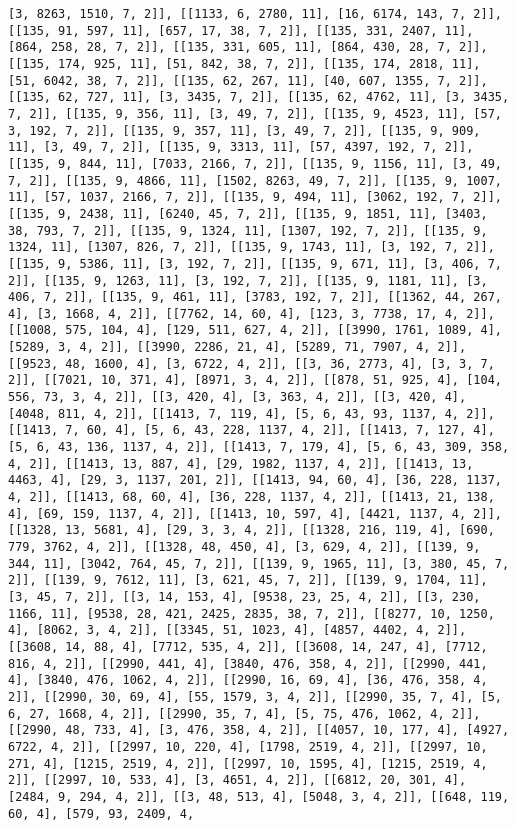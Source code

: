\documentclass[12pt,fleqn]{article}\usepackage{../../common}
\begin{document}
\begin{verbatim}
[3, 8263, 1510, 7, 2]], [[1133, 6, 2780, 11], [16, 6174, 143, 7, 2]], [[135, 91, 597, 11], [657, 17, 38, 7, 2]], [[135, 331, 2407, 11], [864, 258, 28, 7, 2]], [[135, 331, 605, 11], [864, 430, 28, 7, 2]], [[135, 174, 925, 11], [51, 842, 38, 7, 2]], [[135, 174, 2818, 11], [51, 6042, 38, 7, 2]], [[135, 62, 267, 11], [40, 607, 1355, 7, 2]], [[135, 62, 727, 11], [3, 3435, 7, 2]], [[135, 62, 4762, 11], [3, 3435, 7, 2]], [[135, 9, 356, 11], [3, 49, 7, 2]], [[135, 9, 4523, 11], [57, 3, 192, 7, 2]], [[135, 9, 357, 11], [3, 49, 7, 2]], [[135, 9, 909, 11], [3, 49, 7, 2]], [[135, 9, 3313, 11], [57, 4397, 192, 7, 2]], [[135, 9, 844, 11], [7033, 2166, 7, 2]], [[135, 9, 1156, 11], [3, 49, 7, 2]], [[135, 9, 4866, 11], [1502, 8263, 49, 7, 2]], [[135, 9, 1007, 11], [57, 1037, 2166, 7, 2]], [[135, 9, 494, 11], [3062, 192, 7, 2]], [[135, 9, 2438, 11], [6240, 45, 7, 2]], [[135, 9, 1851, 11], [3403, 38, 793, 7, 2]], [[135, 9, 1324, 11], [1307, 192, 7, 2]], [[135, 9, 1324, 11], [1307, 826, 7, 2]], [[135, 9, 1743, 11], [3, 192, 7, 2]], [[135, 9, 5386, 11], [3, 192, 7, 2]], [[135, 9, 671, 11], [3, 406, 7, 2]], [[135, 9, 1263, 11], [3, 192, 7, 2]], [[135, 9, 1181, 11], [3, 406, 7, 2]], [[135, 9, 461, 11], [3783, 192, 7, 2]], [[1362, 44, 267, 4], [3, 1668, 4, 2]], [[7762, 14, 60, 4], [123, 3, 7738, 17, 4, 2]], [[1008, 575, 104, 4], [129, 511, 627, 4, 2]], [[3990, 1761, 1089, 4], [5289, 3, 4, 2]], [[3990, 2286, 21, 4], [5289, 71, 7907, 4, 2]], [[9523, 48, 1600, 4], [3, 6722, 4, 2]], [[3, 36, 2773, 4], [3, 3, 7, 2]], [[7021, 10, 371, 4], [8971, 3, 4, 2]], [[878, 51, 925, 4], [104, 556, 73, 3, 4, 2]], [[3, 420, 4], [3, 363, 4, 2]], [[3, 420, 4], [4048, 811, 4, 2]], [[1413, 7, 119, 4], [5, 6, 43, 93, 1137, 4, 2]], [[1413, 7, 60, 4], [5, 6, 43, 228, 1137, 4, 2]], [[1413, 7, 127, 4], [5, 6, 43, 136, 1137, 4, 2]], [[1413, 7, 179, 4], [5, 6, 43, 309, 358, 4, 2]], [[1413, 13, 887, 4], [29, 1982, 1137, 4, 2]], [[1413, 13, 4463, 4], [29, 3, 1137, 201, 2]], [[1413, 94, 60, 4], [36, 228, 1137, 4, 2]], [[1413, 68, 60, 4], [36, 228, 1137, 4, 2]], [[1413, 21, 138, 4], [69, 159, 1137, 4, 2]], [[1413, 10, 597, 4], [4421, 1137, 4, 2]], [[1328, 13, 5681, 4], [29, 3, 3, 4, 2]], [[1328, 216, 119, 4], [690, 779, 3762, 4, 2]], [[1328, 48, 450, 4], [3, 629, 4, 2]], [[139, 9, 344, 11], [3042, 764, 45, 7, 2]], [[139, 9, 1965, 11], [3, 380, 45, 7, 2]], [[139, 9, 7612, 11], [3, 621, 45, 7, 2]], [[139, 9, 1704, 11], [3, 45, 7, 2]], [[3, 14, 153, 4], [9538, 23, 25, 4, 2]], [[3, 230, 1166, 11], [9538, 28, 421, 2425, 2835, 38, 7, 2]], [[8277, 10, 1250, 4], [8062, 3, 4, 2]], [[3345, 51, 1023, 4], [4857, 4402, 4, 2]], [[3608, 14, 88, 4], [7712, 535, 4, 2]], [[3608, 14, 247, 4], [7712, 816, 4, 2]], [[2990, 441, 4], [3840, 476, 358, 4, 2]], [[2990, 441, 4], [3840, 476, 1062, 4, 2]], [[2990, 16, 69, 4], [36, 476, 358, 4, 2]], [[2990, 30, 69, 4], [55, 1579, 3, 4, 2]], [[2990, 35, 7, 4], [5, 6, 27, 1668, 4, 2]], [[2990, 35, 7, 4], [5, 75, 476, 1062, 4, 2]], [[2990, 48, 733, 4], [3, 476, 358, 4, 2]], [[4057, 10, 177, 4], [4927, 6722, 4, 2]], [[2997, 10, 220, 4], [1798, 2519, 4, 2]], [[2997, 10, 271, 4], [1215, 2519, 4, 2]], [[2997, 10, 1595, 4], [1215, 2519, 4, 2]], [[2997, 10, 533, 4], [3, 4651, 4, 2]], [[6812, 20, 301, 4], [2484, 9, 294, 4, 2]], [[3, 48, 513, 4], [5048, 3, 4, 2]], [[648, 119, 60, 4], [579, 93, 2409, 4, 
\end{verbatim}
\end{document}
